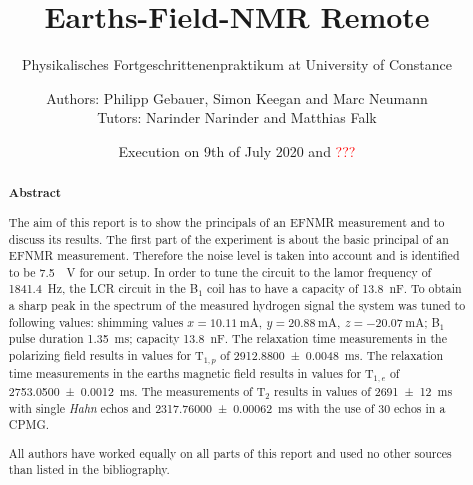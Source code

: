 \title{Earths-Field-NMR Remote}
\subtitle{Physikalisches Fortgeschrittenenpraktikum at University of Constance}
\author{Authors: Philipp Gebauer, Simon Keegan and Marc Neumann \\ \large{Tutors: Narinder Narinder and Matthias Falk}}
\date{Execution on 9th of July 2020 and \textcolor{red}{???}}
\maketitle
\begin{abstract}
    \begin{center}
        \Large{\textsf{\textbf{Abstract}}}
    \end{center}
    \vspace{0.75 cm}
    \begin{singlespace}
    \noindent The aim of this report is to show the principals of an EFNMR measurement and to discuss its results.\newline
    The first part of the experiment is about the basic principal of an EFNMR measurement. Therefore the noise level is taken into account and is identified to be \SI{7.5}{\mu \volt} for our setup. In order to tune the circuit to the lamor frequency of \SI{1841.4}{\hertz}, the LCR circuit in the B$_1$ coil has to have a capacity of \SI{13.8}{\nano \farad}. To obtain a sharp peak in the spectrum of the measured hydrogen signal the system was tuned to following values: shimming values $x = \SI{10.11}{\milli \ampere}, \ y = \SI{20.88}{\milli \ampere}, \ z = \SI{-20.07}{\milli \ampere}$; B$_1$ pulse duration \SI{1.35}{\milli \second}; capacity \SI{13.8}{\nano \farad}. The relaxation time measurements in the polarizing field results in values for T$_{1,p}$ of \SI{2912.8800 \pm 0.0048}{\milli \second}. The relaxation time measurements in the earths magnetic field results in values for T$_{1,e}$ of \SI{2753.0500 \pm 0.0012}{\milli \second}. The measurements of T$_2$ results in values of \SI{2691 \pm 12}{\milli \second} with single \textit{Hahn} echos and \SI{2317.76000 \pm 0.00062}{\milli \second} with the use of 30 echos in a CPMG.
    \vspace{0.75 cm}
     
    \noindent All authors have worked equally on all parts of this report and used no other sources than listed in the bibliography.

\end{singlespace}
\end{abstract}

\thispagestyle{empty}
\newpage